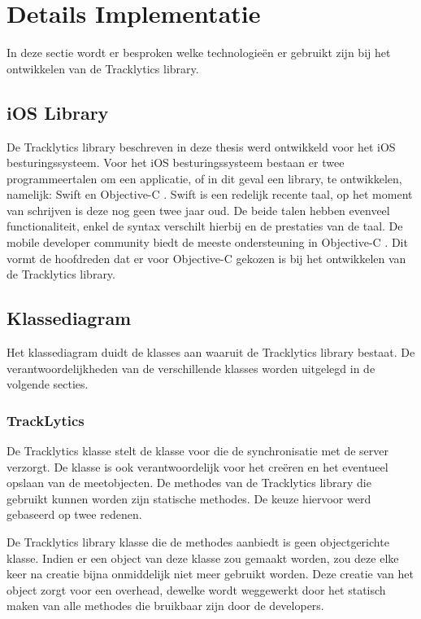 \section{Details Implementatie}
In deze sectie wordt er besproken welke technologie\"en er gebruikt zijn bij het ontwikkelen van de Tracklytics library.

\subsection{iOS Library}
De Tracklytics library beschreven in deze thesis werd ontwikkeld voor het iOS besturingssysteem. Voor het iOS besturingssysteem bestaan er twee programmeertalen om een applicatie, of in dit geval een library, te ontwikkelen, namelijk: Swift\cite{Swift} en Objective-C \cite{ObjectiveC}. Swift is een redelijk recente taal, op het moment van schrijven is deze nog geen twee jaar oud. De beide talen hebben evenveel functionaliteit, enkel de syntax verschilt hierbij en de prestaties van de taal. De mobile developer community biedt de meeste ondersteuning in Objective-C \cite{SwiftVSObjectiveC}. Dit vormt de hoofdreden dat er voor Objective-C gekozen is bij het ontwikkelen van de Tracklytics library.


\subsection{Klassediagram}
Het klassediagram duidt de klasses aan waaruit de Tracklytics library bestaat. De verantwoordelijkheden van de verschillende klasses worden uitgelegd in de volgende secties.

\subsubsection{TrackLytics}
De Tracklytics klasse stelt de klasse voor die de synchronisatie met de server verzorgt. De klasse is ook verantwoordelijk voor het creëren en het eventueel opslaan van de meetobjecten. De methodes van de Tracklytics library die gebruikt kunnen worden zijn statische methodes. De keuze hiervoor werd gebaseerd op twee redenen.

De Tracklytics library klasse die de methodes aanbiedt is geen objectgerichte klasse. Indien er een object van deze klasse zou gemaakt worden, zou deze elke keer na creatie bijna onmiddelijk niet meer gebruikt worden. Deze creatie van het object zorgt voor een overhead, dewelke wordt weggewerkt door het statisch maken van alle methodes die bruikbaar zijn door de developers. 

